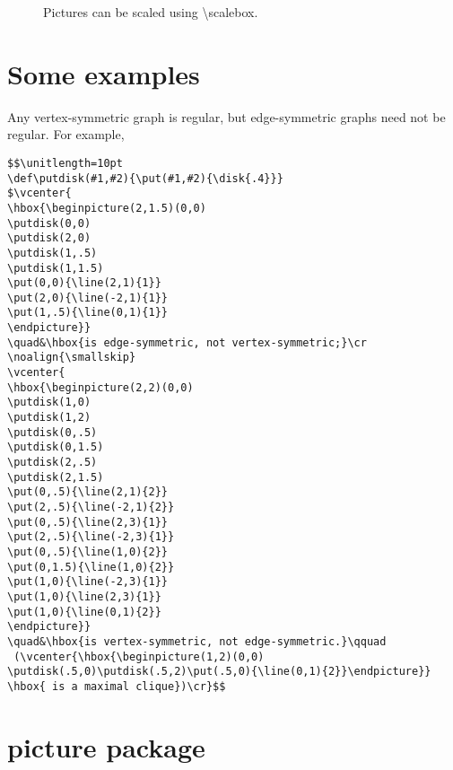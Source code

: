 \begin{figure}
\caption{Pictures can be scaled using \protect\textbackslash scalebox.}
\end{figure}

\section{Some examples}
Any vertex-symmetric graph is regular, but edge-symmetric graphs
need not be regular. For example,
\begin{verbatim}
$$\unitlength=10pt
\def\putdisk(#1,#2){\put(#1,#2){\disk{.4}}}
$\vcenter{
\hbox{\beginpicture(2,1.5)(0,0)
\putdisk(0,0)
\putdisk(2,0)
\putdisk(1,.5)
\putdisk(1,1.5)
\put(0,0){\line(2,1){1}}
\put(2,0){\line(-2,1){1}}
\put(1,.5){\line(0,1){1}}
\endpicture}}
\quad&\hbox{is edge-symmetric, not vertex-symmetric;}\cr
\noalign{\smallskip}
\vcenter{
\hbox{\beginpicture(2,2)(0,0)
\putdisk(1,0)
\putdisk(1,2)
\putdisk(0,.5)
\putdisk(0,1.5)
\putdisk(2,.5)
\putdisk(2,1.5)
\put(0,.5){\line(2,1){2}}
\put(2,.5){\line(-2,1){2}}
\put(0,.5){\line(2,3){1}}
\put(2,.5){\line(-2,3){1}}
\put(0,.5){\line(1,0){2}}
\put(0,1.5){\line(1,0){2}}
\put(1,0){\line(-2,3){1}}
\put(1,0){\line(2,3){1}}
\put(1,0){\line(0,1){2}}
\endpicture}}
\quad&\hbox{is vertex-symmetric, not edge-symmetric.}\qquad
 (\vcenter{\hbox{\beginpicture(1,2)(0,0)
\putdisk(.5,0)\putdisk(.5,2)\put(.5,0){\line(0,1){2}}\endpicture}}
\hbox{ is a maximal clique})\cr}$$
\end{verbatim}



\section{picture package}

